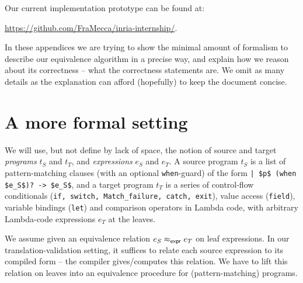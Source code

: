 \documentclass[12pt]{article}
\begin{document}
Our current implementation prototype can be found at:
\begin{center}
  \url{https://github.com/FraMecca/inria-internship/}.
\end{center}

\appendix
\appendixpage

In these appendices we are trying to show the minimal amount of
formalism to describe our equivalence algorithm in a precise way, and
explain how we reason about its correctness -- what the correctness
statements are. We omit as many details as the explanation can afford
(hopefully) to keep the document concise.

\section{A more formal setting}

We will use, but not define by lack of space, the notion of source and
target \emph{programs} $t_S$ and $t_T$, and \emph{expressions} $e_S$
and $e_T$. A source program $t_S$ is a list of pattern-matching
clauses (with an optional \texttt{when}-guard) of the form
\lstinline{| $p$ (when $e_S$)? -> $e_S$}, and a target program $t_T$
is a series of control-flow conditionals (\texttt{if, switch,
  Match\_failure, catch, exit}), value access (\texttt{field}),
variable bindings (\texttt{let}) and comparison operators in Lambda
code, with arbitrary Lambda-code expressions $e_T$ at the leaves.

We assume given an equivalence relation $e_S \mathrel{\approx_{\mathsf{expr}}} e_T$ on leaf
expressions. In our translation-validation setting, it suffices to
relate each source expression to its compiled form -- the compiler
gives/computes this relation. We have to lift this relation on leaves
into an equivalence procedure for (pattern-matching) programs.
\end{document}
